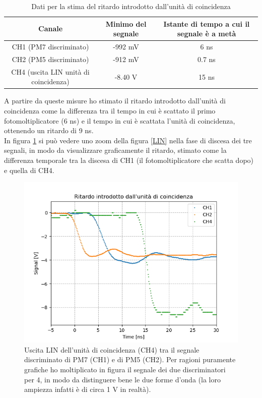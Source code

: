 \documentclass{article}
\begin{document}
\begin{table}[h!]
    \centering
    \begin{tabular}{|c|c|c|}
        \hline
        Canale & Minimo del segnale & Istante di tempo a cui il segnale è a metà\\
        \hline
            CH1 (PM7 discriminato) & -992 mV & 6 ns \\
            CH2 (PM5 discriminato)& -912 mV& 0.7 ns   \\
            CH4 (uscita LIN unità di coincidenza) & -8.40 V & 15 ns\\
        \hline
    \end{tabular}
    \caption{Dati per la stima del ritardo introdotto dall'unità di coincidenza}
    \label{tab3}
\end{table}
A partire da queste misure ho stimato il ritardo introdotto dall'unità di coincidenza come la differenza tra il tempo in cui è scattato il primo fotomoltiplicatore (6 ns) e il tempo in cui è scattata l'unità di coincidenza, ottenendo un ritardo di 9 ns.
\\
In figura \ref{LINrit} si può vedere uno zoom della figura \ref{LIN} nella fase di discesa dei tre segnali, in modo da visualizzare graficamente il ritardo, stimato come la differenza temporale tra la discesa di CH1 (il fotomoltiplicatore che scatta dopo) e quella di CH4. 
\begin{figure}[h!]
\begin{center}
\includegraphics[scale=0.65]{Grafici/LIN_ritardo.png}
\caption{Uscita LIN dell'unità di coincidenza (CH4) tra il segnale discriminato di PM7 (CH1) e di PM5 (CH2). Per ragioni puramente grafiche ho moltiplicato in figura il segnale dei due discriminatori per 4, in modo da distinguere bene le due forme d'onda (la loro ampiezza infatti è di circa 1 V in realtà).} \label{LINrit}
\end{center}
\end{figure}
\end{document}
